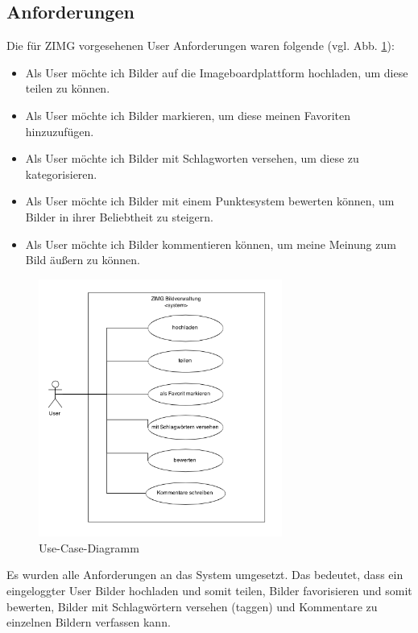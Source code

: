 \documentclass[12pt, oneside, a4paper]{article}		%
\begin{document}
\subsection{Anforderungen}

Die für ZIMG vorgesehenen User Anforderungen waren folgende (vgl. Abb. \ref{ZIMGUseCaseDiagram}):

\begin{itemize}
	\item Als User möchte ich Bilder auf die Imageboardplattform hochladen, um diese teilen zu können.
	\item Als User möchte ich Bilder markieren, um diese meinen Favoriten hinzuzufügen.
	\item Als User möchte ich Bilder mit Schlagworten versehen, um diese zu kategorisieren.
	\item Als User möchte ich Bilder mit einem Punktesystem bewerten können, um Bilder in ihrer Beliebtheit zu steigern.
	\item Als User möchte ich Bilder kommentieren können, um meine Meinung zum Bild äußern zu können.
\end{itemize}

\begin{figure}[H]
 	\centering
 	\includegraphics[width=8cm]{footage/ZIMG_UseCaseDiagram} 
 	\caption{Use-Case-Diagramm}
	\label{ZIMGUseCaseDiagram}
 \end{figure}

 Es wurden alle Anforderungen an das System umgesetzt. Das bedeutet, dass ein eingeloggter User Bilder hochladen und somit teilen, Bilder favorisieren und somit bewerten, Bilder mit Schlagwörtern versehen (taggen) und Kommentare zu einzelnen Bildern verfassen kann.
\end{document}
